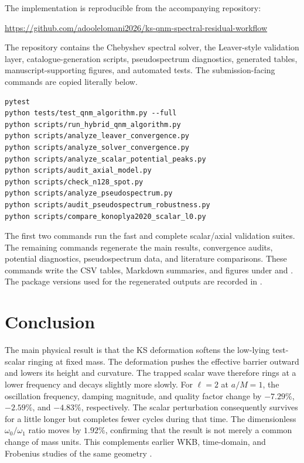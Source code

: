 \documentclass[12pt,a4paper]{article}
\begin{document}
The implementation is reproducible from the accompanying repository:
\begin{center}
\url{https://github.com/adoolelomani2026/ks-qnm-spectral-residual-workflow}
\end{center}
The repository contains the Chebyshev spectral solver, the Leaver-style validation layer, catalogue-generation scripts, pseudospectrum diagnostics, generated tables, manuscript-supporting figures, and automated tests. The submission-facing commands are copied literally below.
\begin{verbatim}
pytest
python tests/test_qnm_algorithm.py --full
python scripts/run_hybrid_qnm_algorithm.py
python scripts/analyze_leaver_convergence.py
python scripts/analyze_solver_convergence.py
python scripts/analyze_scalar_potential_peaks.py
python scripts/audit_axial_model.py
python scripts/check_n128_spot.py
python scripts/analyze_pseudospectrum.py
python scripts/audit_pseudospectrum_robustness.py
python scripts/compare_konoplya2020_scalar_l0.py
\end{verbatim}
The first two commands run the fast and complete scalar/axial validation
suites.  The remaining commands regenerate the main results, convergence
audits, potential diagnostics, pseudospectrum data, and literature comparisons.
These commands write the CSV tables, Markdown summaries, and figures under  and . The package versions used for the regenerated outputs are recorded in .

\section{Conclusion}

The main physical result is that the KS deformation softens the low-lying
test-scalar ringing at fixed mass.  The deformation pushes the effective
barrier outward and lowers its height and curvature.  The trapped scalar wave
therefore rings at a lower frequency and decays slightly more slowly.  For
\(\ell=2\) at \(a/M=1\), the oscillation frequency, damping magnitude, and
quality factor change by \(-7.29\%\), \(-2.59\%\), and \(-4.83\%\),
respectively.  The scalar perturbation consequently survives for a little
longer but completes fewer cycles during that time.  The dimensionless
\(\omega_0/\omega_1\) ratio moves by \(1.92\%\), confirming that the result is
not merely a common change of mass units.  This complements earlier WKB,
time-domain, and Frobenius studies of the same geometry
\cite{Konoplya2020,Bolokhov2025}.
\end{document}
